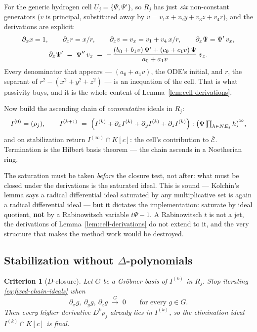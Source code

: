 \documentclass[11pt]{article}
\newcommand{\Psib}{\Psi}
\newcommand{\Ex}{\mathcal{E}}
\newtheorem{criterion}{Criterion}
\begin{document}
For the generic hydrogen cell $U_j = \{\Psib,\Psib'\}$, so $R_j$ has just
\emph{six} non-constant generators ($v$ is principal, substituted away by
$v = v_1x+v_2y+v_3z+v_4r$), and the derivations are explicit:
\begin{gather}
\partial_x x = 1, \qquad \partial_x r = x/r, \qquad
\partial_x v = v_x = v_1 + v_4\,x/r, \qquad
\partial_x \Psib = \Psib'\,v_x, \notag\\
\partial_x \Psib' \;=\; \Psib''\,v_x
  \;=\; -\,\frac{(b_0+b_1v)\,\Psib' + (c_0+c_1v)\,\Psib}{a_0+a_1v}\; v_x .
\label{eq:cell-derivation}
\end{gather}
Every denominator that appears --- $(a_0+a_1v)$, the ODE's initial, and $r$,
the separant of $r^2-(x^2+y^2+z^2)$ --- is an inequation of the cell. That is
what passivity buys, and it is the whole content of
Lemma~\ref{lem:cell-derivations}.

Now build the ascending chain of \emph{commutative} ideals in $R_j$:
\begin{equation}
\label{eq:fixed-chain-ideals}
I^{(0)} = (\rho_j), \qquad
I^{(k+1)} \;=\; \Bigl(I^{(k)} + \partial_x I^{(k)} + \partial_y I^{(k)}
                 + \partial_z I^{(k)}\Bigr) : \bigl(\Psib \textstyle\prod_{h\in NE_j} h\bigr)^{\!\infty},
\end{equation}
and on stabilization return $I^{(\infty)} \cap K[c]$: the cell's contribution
to $\overline{\Ex}$. Termination is the Hilbert basis theorem --- the chain
ascends in a Noetherian ring.

The saturation must be taken \emph{before} the closure test, not after: what
must be closed under the derivations is the saturated ideal. This is sound ---
Kolchin's lemma says a radical differential ideal saturated by any
multiplicative set is again a radical differential ideal --- but it dictates
the implementation: saturate by ideal quotient, \textbf{not} by a Rabinowitsch
variable $t\Psib-1$. A Rabinowitsch $t$ is not a jet, the derivations of
Lemma~\ref{lem:cell-derivations} do not extend to it, and the very structure
that makes the method work would be destroyed.

\subsection{Stabilization without $\Delta$-polynomials}
\label{sec:stabilization}

\begin{criterion}[$D$-closure]
\label{crit:dclosure}
Let $G$ be a Gr\"obner basis of $I^{(k)}$ in $R_j$. Stop iterating
\eqref{eq:fixed-chain-ideals} when
\[
  \partial_x g,\ \partial_y g,\ \partial_z g
  \;\xrightarrow{\ G\ }\; 0
  \qquad\text{for every } g \in G .
\]
Then every higher derivative $D^k\rho_j$ already lies in $I^{(k)}$, so the
elimination ideal $I^{(k)} \cap K[c]$ is final.
\end{criterion}
\end{document}
